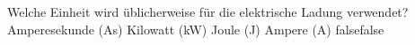     {Welche Einheit wird üblicherweise für die elektrische Ladung verwendet?}
    {Amperesekunde (As)}
    {Kilowatt (kW)}
    {Joule (J)}
    {Ampere (A)}
    {false}{false}